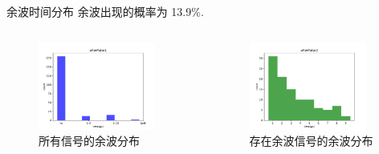 \documentclass[10pt]{beamer}
\begin{document}
\begin{frame}[label={sec:orgd704c4b}]{余波时间分布}
余波出现的概率为 13.9\%.

\begin{columns}
\begin{column}{0.5\columnwidth}
\begin{figure}[htbp]
\centering
\includegraphics[width=0.9\textwidth]{../../DetectorPerform/afterPulse/fig/afterPulse01.pdf}
\caption{所有信号的余波分布}
\end{figure}
\end{column}

\begin{column}{0.5\columnwidth}
\begin{figure}[htbp]
\centering
\includegraphics[width=0.9\textwidth]{../../DetectorPerform/afterPulse/fig/afterPulse02.pdf}
\caption{存在余波信号的余波分布}
\end{figure}
\end{column}
\end{columns}
\end{frame}
\end{document}
